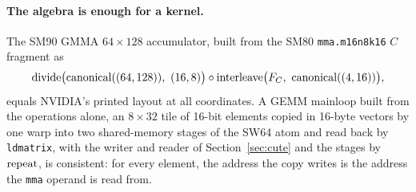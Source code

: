 \paragraph{The algebra is enough for a kernel.} The SM90 GMMA $64 \times
128$ accumulator, built from the SM80 \texttt{mma.m16n8k16} $C$ fragment as
\[
\divideop\big(\mathrm{canonical}((64,128)),\ (16,8)\big) \circ
\interleave\big(F_C,\ \mathrm{canonical}((4,16))\big),
\]
equals NVIDIA's printed layout at all \evalSmNinetyCoords{} coordinates. A
GEMM mainloop
built from the operations alone, an $8 \times 32$ tile of 16-bit elements
copied in 16-byte vectors by one warp into two shared-memory stages of the
SW64 atom and read back by \texttt{ldmatrix}, with the writer and reader of
Section~\ref{sec:cute} and the stages by $\mathrm{repeat}$, is consistent: for
every element, the address the copy writes is the address the \texttt{mma}
operand is read from.
